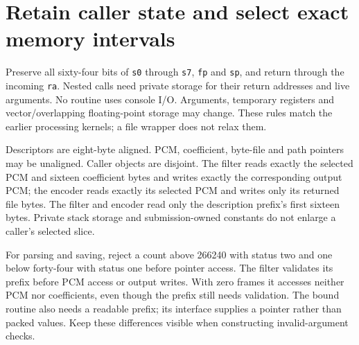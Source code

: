 \section{Retain caller state and select exact memory intervals}
Preserve all sixty-four bits of \texttt{s0} through \texttt{s7}, \texttt{fp} and
\texttt{sp}, and return through the incoming \texttt{ra}. Nested calls need private
storage for their return addresses and live arguments. No routine uses console I/O.
Arguments, temporary registers and vector/overlapping floating-point storage may change.
These rules match the earlier processing kernels; a file wrapper does not relax them.

Descriptors are eight-byte aligned. PCM, coefficient, byte-file and path pointers may
be unaligned. Caller objects are disjoint. The filter reads exactly the selected PCM
and sixteen coefficient bytes and writes exactly the corresponding output PCM; the
encoder reads exactly its selected PCM and writes only its returned file bytes. The
filter and encoder read only the description prefix's first sixteen bytes. Private
stack storage and submission-owned constants do not enlarge a caller's selected slice.

For parsing and saving, reject a count above 266240 with status two and one below
forty-four with status one before pointer access. The filter validates its prefix
before PCM access or output writes. With zero frames it accesses neither PCM nor
coefficients, even though the prefix still needs validation. The bound routine also
needs a readable prefix; its interface supplies a pointer rather than packed values.
Keep these differences visible when constructing invalid-argument checks.
